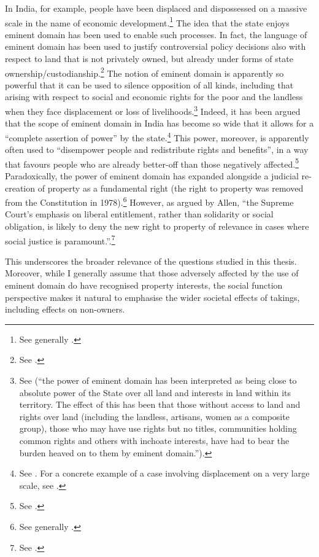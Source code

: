 In India, for example, people have been displaced and dispossessed on a massive scale in the name of economic development.\footnote{See generally \cite{levien13}.} The idea that the state enjoys eminent domain has been used to enable such processes. In fact, the language of eminent domain has been used to justify controversial policy decisions also with respect to land that is not privately owned, but already under forms of state ownership/custodianship.\footnote{See \cite[141]{usha09}.} The notion of eminent domain is apparently so powerful that it can be used to silence opposition of all kinds, including that arising with respect to social and economic rights for the poor and the landless when they face displacement or loss of livelihoods.\footnote{See \cite[143-144]{usha09} (``the power of eminent domain has been interpreted as being close to absolute power of the State over all land and interests in land within its territory. The effect of this has been that those without access to land and rights over land (including the landless, artisans, women as a composite group), those who may have use rights but no titles, communities holding common rights and others with inchoate interests, have had to bear the burden heaved on to them by eminent domain.'').} Indeed, it has been argued that the scope of eminent domain in India has become so wide that it allows for a ``complete assertion of power'' by the state.\footnote{See \cite[43]{cullet09}. For a concrete example of a case involving displacement on a very large scale, see \cite{cullet01}.} This power, moreover, is apparently often used to ``disempower people and redistribute rights and benefits'', in a way that favours people who are already better-off than those negatively affected.\footnote{See \cite[33]{cullet09}.} Paradoxically, the power of eminent domain has expanded alongside a judicial re-creation of property as a fundamental right (the right to property was removed from the Constitution in 1978).\footnote{See generally \cite{allen15}.} However, as argued by Allen, ``the Supreme Court’s emphasis on liberal entitlement, rather than solidarity or social obligation, is likely to deny the new right to property of relevance in cases where social justice is paramount.''.\footnote{See \cite[30]{allen15}.}

This underscores the broader relevance of the questions studied in this thesis. Moreover, while I generally assume that those adversely affected by the use of eminent domain do have recognised property interests, the social function perspective makes it natural to emphasise the wider societal effects of takings, including effects on non-owners.

